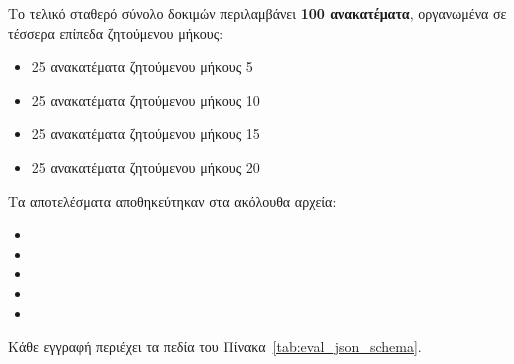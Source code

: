 Το τελικό σταθερό σύνολο δοκιμών περιλαμβάνει \textbf{100 ανακατέματα}, οργανωμένα σε τέσσερα επίπεδα ζητούμενου μήκους:
\begin{itemize}
    \item 25 ανακατέματα ζητούμενου μήκους 5
    \item 25 ανακατέματα ζητούμενου μήκους 10
    \item 25 ανακατέματα ζητούμενου μήκους 15
    \item 25 ανακατέματα ζητούμενου μήκους 20
\end{itemize}

Τα αποτελέσματα αποθηκεύτηκαν στα ακόλουθα αρχεία:
\begin{itemize}
    \item {}
    \item {}
    \item {}
    \item {}
    \item {}
\end{itemize}
Κάθε εγγραφή περιέχει τα πεδία του Πίνακα~\ref{tab:eval_json_schema}.

